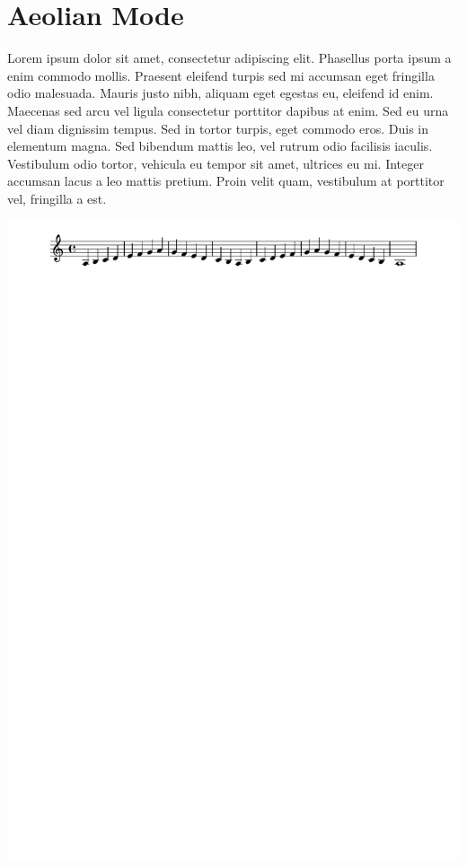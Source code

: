 \documentclass[11pt]{article}
\begin{document}
\section*{Aeolian Mode}
\label{sec:org281e993}

Lorem ipsum dolor sit amet, consectetur adipiscing elit. Phasellus
porta ipsum a enim commodo mollis. Praesent eleifend turpis sed mi
accumsan eget fringilla odio malesuada. Mauris justo nibh, aliquam
eget egestas eu, eleifend id enim. Maecenas sed arcu vel ligula
consectetur porttitor dapibus at enim. Sed eu urna vel diam dignissim
tempus. Sed in tortor turpis, eget commodo eros. Duis in elementum
magna. Sed bibendum mattis leo, vel rutrum odio facilisis iaculis.
Vestibulum odio tortor, vehicula eu tempor sit amet, ultrices eu mi.
Integer accumsan lacus a leo mattis pretium. Proin velit quam,
vestibulum at porttitor vel, fringilla a est.

\begin{center}
\includegraphics[width=.9\linewidth]{aeolian.pdf}
\end{center}
\end{document}
